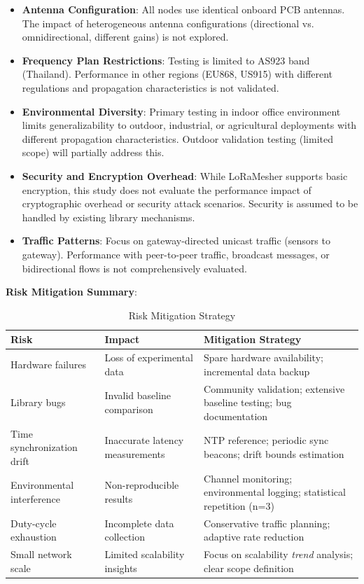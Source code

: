 \begin{itemize}
\item \textbf{Antenna Configuration}: All nodes use identical onboard PCB antennas. The impact of heterogeneous antenna configurations (directional vs. omnidirectional, different gains) is not explored.

\item \textbf{Frequency Plan Restrictions}: Testing is limited to AS923 band (Thailand). Performance in other regions (EU868, US915) with different regulations and propagation characteristics is not validated.

\item \textbf{Environmental Diversity}: Primary testing in indoor office environment limits generalizability to outdoor, industrial, or agricultural deployments with different propagation characteristics. Outdoor validation testing (limited scope) will partially address this.

\item \textbf{Security and Encryption Overhead}: While LoRaMesher supports basic encryption, this study does not evaluate the performance impact of cryptographic overhead or security attack scenarios. Security is assumed to be handled by existing library mechanisms.

\item \textbf{Traffic Patterns}: Focus on gateway-directed unicast traffic (sensors to gateway). Performance with peer-to-peer traffic, broadcast messages, or bidirectional flows is not comprehensively evaluated.
\end{itemize}

\textbf{Risk Mitigation Summary}:

\begin{table}[h]
\centering
\caption{Risk Mitigation Strategy}
\label{tab:risk-mitigation}
\begin{tabular}{p{4cm}p{3cm}p{7cm}}
\hline
\textbf{Risk} & \textbf{Impact} & \textbf{Mitigation Strategy} \\
\hline
Hardware failures & Loss of experimental data & Spare hardware availability; incremental data backup \\
\hline
Library bugs & Invalid baseline comparison & Community validation; extensive baseline testing; bug documentation \\
\hline
Time synchronization drift & Inaccurate latency measurements & NTP reference; periodic sync beacons; drift bounds estimation \\
\hline
Environmental interference & Non-reproducible results & Channel monitoring; environmental logging; statistical repetition (n=3) \\
\hline
Duty-cycle exhaustion & Incomplete data collection & Conservative traffic planning; adaptive rate reduction \\
\hline
Small network scale & Limited scalability insights & Focus on scalability \emph{trend} analysis; clear scope definition \\
\hline
\end{tabular}
\end{table}

